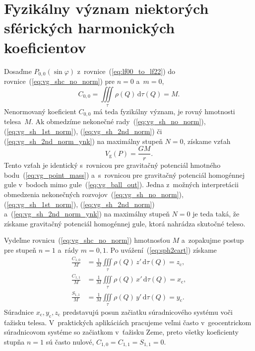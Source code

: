 \documentclass[a4paper, 12pt]{book}
\newcommand{\diff}{\mathrm d}
\newcommand{\gidx}{\mathrm g}
\begin{document}

\section{Fyzikálny význam niektorých sférických harmonických koeficientov}
\label{sec:physical_meaning_of_spherical_harmonic_coefficients}

Dosaďme $P_{0,0}(\sin\varphi)$ z~rovnice~(\ref{eq:lf00_to_lf22})
do rovnice~(\ref{eq:vg_shc_no_norm}) pre $n = 0$ a~$m = 0$,
%
\begin{equation}
\label{eq:c00_mass}
C_{0,0} = \iiint\limits_{\tau} \rho(Q) \, \diff \tau(Q) = M{.}
\end{equation}
%
Nenormovaný koeficient $C_{0,0}$ má teda fyzikálny význam, je rovný hmotnosti 
telesa~$M$.  Ak obmedzíme nekonečné rady~(\ref{eq:vg_sh_no_norm}), 
(\ref{eq:vg_sh_1st_norm}), (\ref{eq:vg_sh_2nd_norm}) či 
(\ref{eq:vg_sh_2nd_norm_ynk}) na maximálny stupeň $N = 0$, získame vzťah
%
\begin{equation}
\label{eq:vg_sh_0degree}
V_\gidx(P) = \frac{GM}{r}{.}
\end{equation}
%
Tento vzťah je identický s~rovnicou pre gravitačný potenciál hmotného 
bodu~(\ref{eq:vg_point_mass}) a~s~rovnicou pre gravitačný potenciál homogénnej 
gule v~bodoch mimo gule~(\ref{eq:vg_ball_out}).  Jedna z~možných interpretácii 
obmedzenia nekonečných rozvojov~(\ref{eq:vg_sh_no_norm}), 
(\ref{eq:vg_sh_1st_norm}), (\ref{eq:vg_sh_2nd_norm}) 
a~(\ref{eq:vg_sh_2nd_norm_ynk}) na maximálny stupeň $N = 0$ je teda taká, že 
získame gravitačný potenciál homogénnej gule, ktorá nahrádza skutočné teleso.

Vydeľme rovnicu~(\ref{eq:vg_shc_no_norm}) hmotnosťou $M$ a~zopakujme postup pre
stupeň $n = 1$ a~rády $m = 0, 1$.  Po uvážení~(\ref{eq:sph2cart}) získame
%
\begin{equation}
\begin{split}
\frac{C_{1,0}}{M} &= \frac{1}{M} \iiint\limits_{\tau} \rho(Q) \, z' \, \diff 
\tau(Q) = z_\mathrm{c}{,}\\
\frac{C_{1,1}}{M} &= \frac{1}{M} \iiint\limits_{\tau} \rho(Q) \, x' \, \diff 
\tau(Q) = x_\mathrm{c}{,}\\
\frac{S_{1,1}}{M} &= \frac{1}{M} \iiint\limits_{\tau} \rho(Q) \, y' \, \diff 
\tau(Q) = y_\mathrm{c}{.}
\end{split}
\end{equation}
%
Súradnice $x_\mathrm{c}, y_\mathrm{c}, z_\mathrm{c}$ predstavujú posun
začiatku súradnicového systému voči ťažisku telesa.  V~praktických aplikáciách 
pracujeme veľmi často v~geocentrickom súradnicovom systéme so
začiatkom v~ťažisku Zeme, preto všetky koeficienty stupňa $n = 1$ sú často 
nulové, $C_{1,0} = C_{1,1} = S_{1,1} = 0$.
\end{document}
